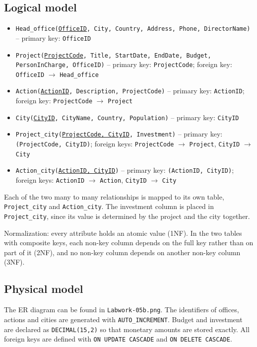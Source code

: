 \documentclass[11pt,a4paper]{article}
\begin{document}
\subsection{Logical model}
\begin{itemize}
    \item \texttt{Head\_office(\underline{OfficeID}, City, Country, Address, Phone, DirectorName)} -- primary key: \texttt{OfficeID}
    \item \texttt{Project(\underline{ProjectCode}, Title, StartDate, EndDate, Budget, PersonInCharge, OfficeID)} -- primary key: \texttt{ProjectCode}; foreign key: \texttt{OfficeID} $\rightarrow$ \texttt{Head\_office}
    \item \texttt{Action(\underline{ActionID}, Description, ProjectCode)} -- primary key: \texttt{ActionID}; foreign key: \texttt{ProjectCode} $\rightarrow$ \texttt{Project}
    \item \texttt{City(\underline{CityID}, CityName, Country, Population)} -- primary key: \texttt{CityID}
    \item \texttt{Project\_city(\underline{ProjectCode, CityID}, Investment)} -- primary key: \texttt{(ProjectCode, CityID)}; foreign keys: \texttt{ProjectCode} $\rightarrow$ \texttt{Project}, \texttt{CityID} $\rightarrow$ \texttt{City}
    \item \texttt{Action\_city(\underline{ActionID, CityID})} -- primary key: \texttt{(ActionID, CityID)}; foreign keys: \texttt{ActionID} $\rightarrow$ \texttt{Action}, \texttt{CityID} $\rightarrow$ \texttt{City}
\end{itemize}

Each of the two many to many relationships is mapped to its own table, \texttt{Project\_city} and \texttt{Action\_city}. The investment column is placed in \texttt{Project\_city}, since its value is determined by the project and the city together.

Normalization: every attribute holds an atomic value (1NF). In the two tables with composite keys, each non-key column depends on the full key rather than on part of it (2NF), and no non-key column depends on another non-key column (3NF).

\subsection{Physical model}
The ER diagram can be found in \texttt{Labwork-05b.png}. The identifiers of offices, actions and cities are generated with \texttt{AUTO\_INCREMENT}. Budget and investment are declared as \texttt{DECIMAL(15,2)} so that monetary amounts are stored exactly. All foreign keys are defined with \texttt{ON UPDATE CASCADE} and \texttt{ON DELETE CASCADE}.
\end{document}
